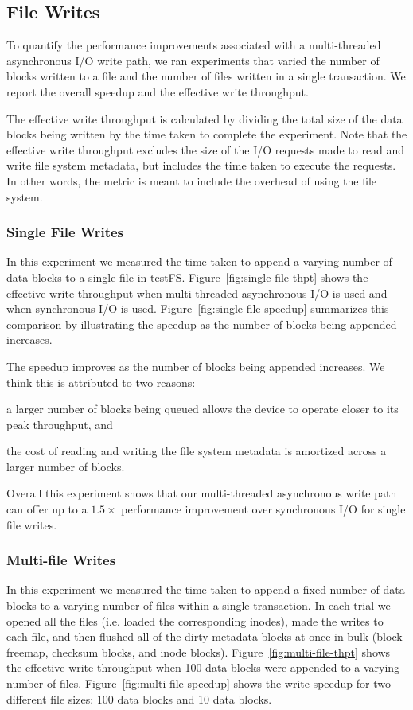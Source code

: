 \subsection{File Writes}
To quantify the performance improvements associated with a multi-threaded
asynchronous I/O write path, we ran experiments that varied the number of
blocks written to a file and the number of files written in a single
transaction. We report the overall speedup and the effective write throughput.

The effective write throughput is calculated by dividing the total size of the
data blocks being written by the time taken to complete the experiment. Note
that the effective write throughput excludes the size of the I/O requests made
to read and write file system metadata, but includes the time taken to execute
the requests. In other words, the metric is meant to include the overhead of
using the file system.

\subsubsection{Single File Writes}
In this experiment we measured the time taken to append a varying number of
data blocks to a single file in testFS. Figure~\ref{fig:single-file-thpt} shows
the effective write throughput when multi-threaded asynchronous I/O is used and
when synchronous I/O is used. Figure~\ref{fig:single-file-speedup} summarizes
this comparison by illustrating the speedup as the number of blocks being
appended increases.

The speedup improves as the number of blocks being appended increases. We think
this is attributed to two reasons:
\begin{enumerate*}[label={(\roman*)}]
  \item a larger number of blocks being queued allows the device to operate
    closer to its peak throughput, and
  \item the cost of reading and writing the file system metadata is amortized
    across a larger number of blocks.
\end{enumerate*}
Overall this experiment shows that our multi-threaded asynchronous write path
can offer up to a $1.5\times$ performance improvement over synchronous I/O for
single file writes.

\subsubsection{Multi-file Writes}
In this experiment we measured the time taken to append a fixed number of data
blocks to a varying number of files within a single transaction. In each trial
we opened all the files (i.e. loaded the corresponding inodes), made the writes
to each file, and then flushed all of the dirty metadata blocks at once in bulk
(block freemap, checksum blocks, and inode blocks).
Figure~\ref{fig:multi-file-thpt} shows the effective write throughput when
100 data blocks were appended to a varying number of files.
Figure~\ref{fig:multi-file-speedup} shows the write speedup for two different
file sizes: 100 data blocks and 10 data blocks.

